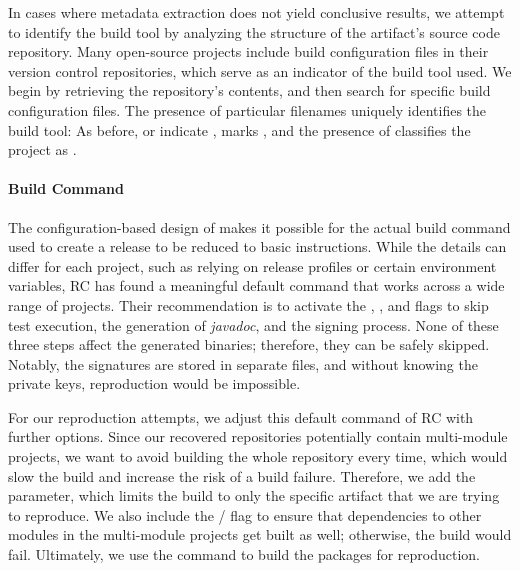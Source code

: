 \documentclass[smallextended]{svjour3}
\newcommand{\maven}[1]{\tool{Maven{#1}}}
\newcommand{\gradle}[1]{\tool{Gradle{#1}}}
\newcommand{\ant}[1]{\tool{Ant{#1}}}
\begin{document}
In cases where metadata extraction does not yield conclusive results, we attempt to identify the build tool by analyzing the structure of the artifact's source code repository. Many open-source projects include build configuration files in their version control repositories, which serve as an indicator of the build tool used. We begin by retrieving the repository's contents, and then search for specific build configuration files. The presence of particular filenames uniquely identifies the build tool: As before,  or  indicate \gradle{},  marks \ant{}, and the presence of  classifies the project as \maven{}.




\paragraph{Build Command}
\label{sec:command}
The configuration-based design of \maven{} makes it possible for the actual build command used to create a release to be reduced to basic instructions. While the details can differ for each project, such as relying on release profiles or certain environment variables, RC has found a meaningful default command that works across a wide range of projects. Their recommendation is to activate the , , and  flags to skip test execution, the generation of \emph{javadoc}, and the  signing process. None of these three steps affect the generated binaries; therefore, they can be safely skipped. Notably, the signatures are stored in separate files, and without knowing the private keys, reproduction would be impossible.

For our reproduction attempts, we adjust this default command of RC with further options. Since our recovered repositories potentially contain multi-module projects, we want to avoid building the whole repository every time, which would slow the build and increase the risk of a build failure. Therefore, we add the  parameter, which limits the build to only the specific artifact that we are trying to reproduce. We also include the / flag to ensure that dependencies to other modules in the multi-module projects get built as well; otherwise, the build would fail. Ultimately, we use the command  to build the packages for reproduction. 
\end{document}
